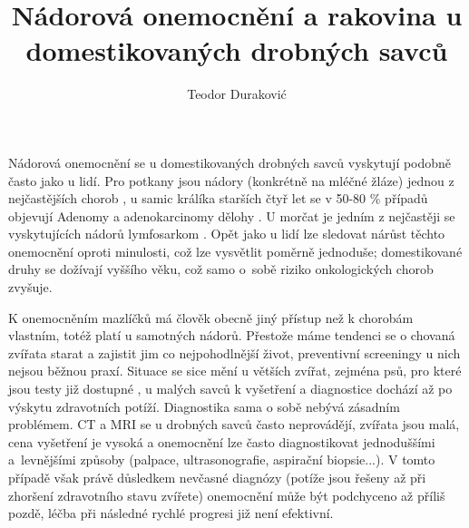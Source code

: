 \documentclass[czech,11pt,a4paper]{article}
\title{Nádorová onemocnění a rakovina u domestikovaných drobných savců }
\author{Teodor Duraković}
\begin{document}
	

	
	

	\maketitle

		
	
	
	
	
	

	

	
	Nádorová onemocnění se u domestikovaných drobných savců vyskytují podobně často jako u lidí. Pro potkany jsou nádory (konkrétně na mléčné žláze) jednou z nejčastějších chorob \cite{UH}, u samic králíka starších čtyř let se v 50-80 $\%$ případů objevují Adenomy a adenokarcinomy dělohy \cite {duchek, cavl, Wiley}. U morčat je jedním z nejčastěji se vyskytujících nádorů lymfosarkom \cite{caviai}. Opět jako u lidí lze sledovat nárůst těchto onemocnění oproti minulosti, což lze vysvětlit poměrně jednoduše; domestikované druhy se dožívají vyššího věku, což samo o~sobě riziko onkologických chorob zvyšuje.
	
	K onemocněním mazlíčků má člověk obecně jiný přístup než k chorobám vlastním, totéž platí u samotných nádorů. Přestože máme tendenci se o chovaná zvířata starat a zajistit jim co nejpohodlnější život, preventivní screeningy u nich nejsou běžnou praxí. Situace se sice mění u větších zvířat, zejména psů, pro které jsou testy již dostupné \cite{veteo2024nuq}, u malých savců k vyšetření a diagnostice dochází až po výskytu zdravotních potíží. Diagnostika sama o sobě nebývá zásadním problémem. CT a MRI se u drobných savců často neprovádějí, zvířata jsou malá, cena vyšetření je vysoká a onemocnění lze často diagnostikovat jednoduššími a~levnějšími způsoby (palpace, ultrasonografie, aspirační biopsie...). V tomto případě však právě důsledkem nevčasné diagnózy (potíže jsou řešeny až při zhoršení zdravotního stavu zvířete) onemocnění může být podchyceno až příliš pozdě, léčba při následné rychlé progresi již není efektivní.
	
\end{document}
